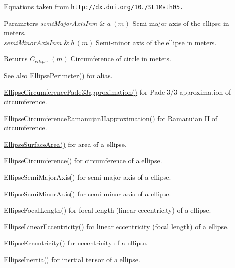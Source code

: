 Equations taken from \href{http://dx.doi.org/10.3247/SL1Math05.004}{\tt http\+://dx.\+doi.\+org/10./\+S\+L1\+Math05.} 
\begin{DoxyParams}{Parameters}
{\em semi\+Major\+Axis\+Inm} & $ a\ (m)$ Semi-\/major axis of the ellipse in meters. \\
\hline
{\em semi\+Minor\+Axis\+Inm} & $ b\ (m)$ Semi-\/minor axis of the ellipse in meters. \\
\hline
\end{DoxyParams}
\begin{DoxyReturn}{Returns}
$ C_{ellipse}\ (m)$ Circumference of circle in meters. 
\end{DoxyReturn}
\begin{DoxySeeAlso}{See also}
\mbox{\hyperlink{group___e_g_x_math-_geometry-2_d-_ellipse-_circumference_ga2d4ee70e08d6fb4b56209ad4fc3f38ca}{Ellipse\+Perimeter()}} for alias. 

\mbox{\hyperlink{group___e_g_x_math-_geometry-2_d-_ellipse-_circumference_ga0e0b290f1da2605c16ec13b9e221769d}{Ellipse\+Circumference\+Pade33approximation()}} for Pade 3/3 approximation of circumference. 

\mbox{\hyperlink{group___e_g_x_math-_geometry-2_d-_ellipse-_circumference_gaa908406db81fadc7c2d73e4e113d24d7}{Ellipse\+Circumference\+Ramanujan\+I\+Iapproximation()}} for Ramanujan II of circumference. 

\mbox{\hyperlink{group___e_g_x_math-_geometry-2_d-_ellipse-_surface_area_ga4ce8c8323e9718ce5458f4ab7f6d823d}{Ellipse\+Surface\+Area()}} for area of a ellipse. 

\mbox{\hyperlink{group___e_g_x_math-_geometry-2_d-_ellipse-_circumference_ga4172802ac674eb53467b44928ac635c7}{Ellipse\+Circumference()}} for circumference of a ellipse. 

Ellipse\+Semi\+Major\+Axis() for semi-\/major axis of a ellipse. 

Ellipse\+Semi\+Minor\+Axis() for semi-\/minor axis of a ellipse. 

Ellipse\+Focal\+Length() for focal length (linear eccentricity) of a ellipse. 

Ellipse\+Linear\+Eccentricity() for linear eccentricity (focal length) of a ellipse. 

\mbox{\hyperlink{group___e_g_x_math-_geometry-2_d-_ellipse-_eccentricity_ga6a0a7fba17f782616894cfc447628c33}{Ellipse\+Eccentricity()}} for eccentricity of a ellipse. 

\mbox{\hyperlink{group___e_g_x_math-_geometry-2_d-_ellipse-_inertia_ga10a3049c2f04b50f271fb01dc62e4cf8}{Ellipse\+Inertia()}} for inertial tensor of a ellipse. 
\end{DoxySeeAlso}
\mbox{\label{group___e_g_x_math-_geometry-2_d-_ellipse-_circumference_ga0e0b290f1da2605c16ec13b9e221769d}} 

